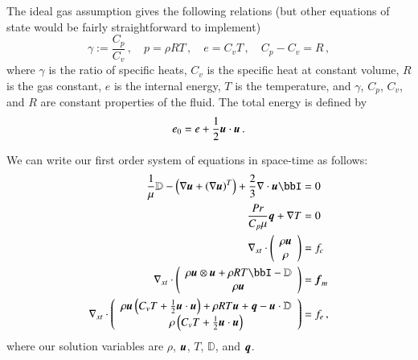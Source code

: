 \documentclass[preprint,12pt]{elsarticle}
\begin{document}
The ideal gas assumption gives the following relations (but other equations of state would be fairly straightforward to implement)
\begin{equation*}
	\gamma:=\frac{C_p}{C_v}\,,\quad p=\rho RT\,,\quad e=C_v T\,,\quad C_p-C_v=R\,,
\end{equation*}
where $\gamma$ is the ratio of specific heats, $C_v$ is the specific heat at constant volume, $R$ is the gas constant,
$e$ is the internal energy, $T$ is the temperature,
and $\gamma$, $C_p$, $C_v$, and $R$ are constant properties of the fluid.
The total energy is defined by
\begin{equation*}
	e_0=e+\frac{1}{2}\boldsymbol u\cdot\boldsymbol u\,.
\end{equation*}

We can write our first order system of equations in space-time as follows:
\begin{subequations}
\label{eq:compressibleNSFirstOrder}
\begin{align}
	\frac{1}{\mu}\mathbb{D}-\LRp{\Grad\bfu+\LRp{\Grad\bfu}^T}+\frac{2}{3}\Div\bfu\bbI&=0\\
	\frac{Pr}{C_p\mu}\bfq+\Grad T&=0\\
	\Divxt\vecttwo{\rho\bfu}{\rho}&=f_c\\
	\Divxt\vecttwo{\rho\bfu\otimes\bfu+\rho RT\bbI-\mathbb{D}}{\rho\bfu}&=\bff_m\\
	\Divxt\vecttwo{\rho\bfu\LRp{C_v T+\frac{1}{2}\bfu\cdot\bfu}+\rho RT\bfu+\bfq-\bfu\cdot\mathbb{D}}{\rho\LRp{C_v T+\frac{1}{2}\bfu\cdot\bfu}}&=f_e\,,
\end{align}
\end{subequations}
where our solution variables are $\rho$, $\boldsymbol u$, $T$, $\mathbb{D}$, and $\boldsymbol q$.


%                                                                                           
%                                                                                           
%              
\end{document}

